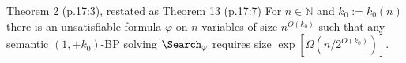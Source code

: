 \begin{result}{Theorem 2 (p.17:3), restated as Theorem 13 (p.17:7)}
For $n\in\mathbb N$ and $k_0:=k_0(n)$ there is an unsatisfiable formula $\varphi$ on $n$ variables of size $n^{O(k_0)}$ such that any semantic $(1,+k_0)$-BP solving $\Search_\varphi$ requires size $\exp[\Omega(n/2^{O(k_0)})]$.
\end{result}
